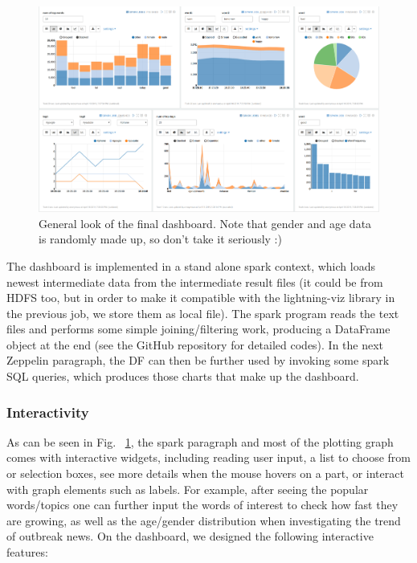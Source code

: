 \documentclass[manuscript, review, screen]{acmart}
\begin{document}
\begin{figure}
    \centering
    \includegraphics[width=\textwidth]{dashboard.png}
    \caption{General look of the final dashboard. Note that gender and age data is randomly made up, so don't take it seriously :)}
    \label{fig:dashboard} 
\end{figure}

The dashboard is implemented in a stand alone spark context, which loads newest intermediate data from the intermediate result files (it could be from HDFS too, but in order to make it compatible with the lightning-viz library in the previous job, we store them as local file). The spark program reads the text files and performs some simple joining/filtering work, producing a DataFrame object at the end (see the GitHub repository for detailed codes). In the next Zeppelin paragraph, the DF can then be further used by invoking some spark SQL queries, which produces those charts that make up the dashboard. 

\subsubsection{Interactivity}
As can be seen in Fig. ~\ref{fig:dashboard}, the spark paragraph and most of the plotting graph comes with interactive widgets, including reading user input, a list to choose from or selection boxes, see more details when the mouse hovers on a part, or interact with graph elements such as labels. For example, after seeing the popular words/topics one can further input the words of interest to check how fast they are growing, as well as the age/gender distribution when investigating the trend of outbreak news. On the dashboard, we designed the following interactive features:
\end{document}
